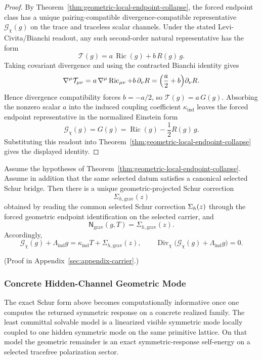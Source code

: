 \begin{proof}
By Theorem~\ref{thm:geometric-local-endpoint-collapse}, the forced endpoint
class has a unique pairing-compatible divergence-compatible representative
\(\mathcal G_{\chi}(g)\) on the trace and traceless scalar channels. Under the
stated Levi-Civita/Bianchi readout, any such second-order natural
representative has the form
\[
\mathcal T(g)=a\,\operatorname{Ric}(g)+b\,R(g)\,g.
\]
Taking covariant divergence and using the contracted Bianchi identity gives
\[
\nabla^\mu \mathcal T_{\mu\nu}
=
a\,\nabla^\mu\operatorname{Ric}_{\mu\nu}+b\,\partial_\nu R
=
\Bigl(\frac a2+b\Bigr)\partial_\nu R.
\]
Hence divergence compatibility forces \(b=-a/2\), so
\(\mathcal T(g)=a\,G(g)\). Absorbing the nonzero scalar \(a\) into the induced
coupling coefficient \(\kappa_{\mathrm{ind}}\) leaves the forced endpoint
representative in the normalized Einstein form
\[
\mathcal G_{\chi}(g)=G(g)=\operatorname{Ric}(g)-\frac12 R(g)\,g.
\]
Substituting this readout into
Theorem~\ref{thm:geometric-local-endpoint-collapse} gives the displayed
identity.
\end{proof}

\begin{corollary}
\label{cor:geometric-schur-remainder-identity}
Assume the hypotheses of
Theorem~\ref{thm:geometric-local-endpoint-collapse}. Assume in addition that
the same selected datum satisfies a canonical selected Schur bridge. Then there
is a unique geometric-projected Schur correction
\[
\Sigma_{h,\mathrm{grav}}(z)
\]
obtained by reading the common selected Schur correction \(\Sigma_{h}(z)\)
through the forced geometric endpoint identification on the selected carrier,
and
\[
\mathsf N_{\mathrm{grav}}(g,T)=\Sigma_{h,\mathrm{grav}}(z).
\]
Accordingly,
\[
\mathcal G_{\chi}(g)+\Lambda_{\mathrm{ind}}g
=
\kappa_{\mathrm{ind}}T+\Sigma_{h,\mathrm{grav}}(z),
\qquad
\operatorname{Div}_{\chi}\bigl(\mathcal G_{\chi}(g)+\Lambda_{\mathrm{ind}}g\bigr)=0.
\]
\end{corollary}

(Proof in Appendix~\ref{sec:appendix-carrier}.)

\subsubsection{Concrete Hidden-Channel Geometric Mode}

The exact Schur form above becomes computationally informative once one
computes the returned symmetric response on a concrete realized family. The
least committal solvable model is a linearized visible symmetric mode locally
coupled to one hidden symmetric mode on the same primitive lattice. On
that model the geometric remainder is an exact symmetric-response
self-energy on a selected tracefree polarization sector.

